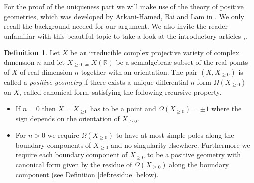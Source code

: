 \documentclass[a4paper,10pt]{amsart}
\theoremstyle{definition}
\newtheorem{defin}{Definition}[section]
\theoremstyle{plain}
\newcommand{\R}{{\mathbb R}}
\begin{document}
For the proof of the uniqueness part we will make use of the theory of positive geometries, which was developed by Arkani-Hamed, Bai and Lam in \cite{ArkanihamedBaiLam2017PosGeom}. We only recall the background needed for our argument. We also invite the reader unfamiliar with this beautiful topic to take a look at the introductory articles \cite{Lam2022PosGeom},\cite{Ranestad2025Whatis}.
\begin{defin}
\label{defi_positive_geom}
    Let $X$ be an irreducible complex projective variety of complex dimension $n$ and let $X_{\geq 0}\subseteq X(\R)$ be a semialgebraic subset of the real points of $X$ of real dimension $n$ together with an orientation. The pair $(X,X_{\geq 0})$ is called a \emph{positive geometry} if there exists a unique differential $n$-form $\Omega(X_{\geq 0})$ on $X$, called canonical form, satisfying the following recursive property. \begin{itemize}
        \item If $n=0$ then $X=X_{\geq 0}$ has to be a point and $\Omega(X_{\geq 0})=\pm 1$ where the sign depends on the orientation of $X_{\geq 0}$.
        \item For $n>0$ we require $\Omega(X_{\geq 0})$ to have at most simple poles along the boundary components of $X_{\geq 0}$ and no singularity elsewhere. Furthermore we require each boundary component of $X_{\geq 0}$ to be a positive geometry with canonical form given by the residue of $\Omega(X_{\geq 0})$ along the boundary component (see Definition \ref{def:residue} below).
    \end{itemize}
\end{defin}
\end{document}

